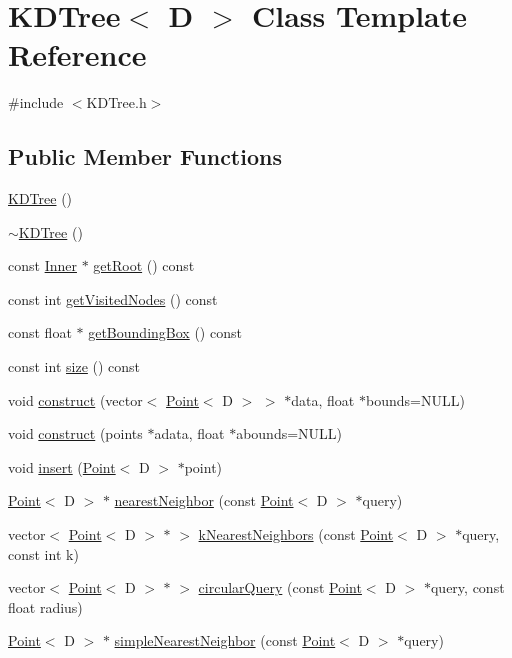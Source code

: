 \hypertarget{classKDTree}{\section{K\-D\-Tree$<$ D $>$ Class Template Reference}
\label{classKDTree}
}


{\ttfamily \#include $<$K\-D\-Tree.\-h$>$}

\subsection*{Public Member Functions}
\begin{DoxyCompactItemize}
\item 
\hyperlink{classKDTree_af8220208eafa9aaacd41164507870fba}{K\-D\-Tree} ()
\item 
\hyperlink{classKDTree_aa4bae329f2bdbb5ed8ce89070c43078c}{$\sim$\-K\-D\-Tree} ()
\item 
const \hyperlink{structInner}{Inner} $\ast$ \hyperlink{classKDTree_ad1ffc917a93f765773dbf3747ae9c7d0}{get\-Root} () const 
\item 
const int \hyperlink{classKDTree_a8e2b12172d5b99ddcbd4d20cbf81d321}{get\-Visited\-Nodes} () const 
\item 
const float $\ast$ \hyperlink{classKDTree_aab6b366c8f0ec6e2a1a9aa1854ee8439}{get\-Bounding\-Box} () const 
\item 
const int \hyperlink{classKDTree_accfe9020b6c62da899799e704e7b336a}{size} () const 
\item 
void \hyperlink{classKDTree_af3a771134ab1e1c1cf86f8c408c19371}{construct} (vector$<$ \hyperlink{structPoint}{Point}$<$ D $>$ $>$ $\ast$data, float $\ast$bounds=N\-U\-L\-L)
\item 
void \hyperlink{classKDTree_ac78f5936a47f871208bc2c85f33f1e83}{construct} (points $\ast$adata, float $\ast$abounds=N\-U\-L\-L)
\item 
void \hyperlink{classKDTree_a3f9325577ee126f3cdab502d0196bd1d}{insert} (\hyperlink{structPoint}{Point}$<$ D $>$ $\ast$point)
\item 
\hyperlink{structPoint}{Point}$<$ D $>$ $\ast$ \hyperlink{classKDTree_a5c1d096debead83854736ee964ed813a}{nearest\-Neighbor} (const \hyperlink{structPoint}{Point}$<$ D $>$ $\ast$query)
\item 
vector$<$ \hyperlink{structPoint}{Point}$<$ D $>$ $\ast$ $>$ \hyperlink{classKDTree_aee22752312318bdcdc2c9eb9507f103f}{k\-Nearest\-Neighbors} (const \hyperlink{structPoint}{Point}$<$ D $>$ $\ast$query, const int k)
\item 
vector$<$ \hyperlink{structPoint}{Point}$<$ D $>$ $\ast$ $>$ \hyperlink{classKDTree_ae64d4d34b6b974f425fe73e910335785}{circular\-Query} (const \hyperlink{structPoint}{Point}$<$ D $>$ $\ast$query, const float radius)
\item 
\hyperlink{structPoint}{Point}$<$ D $>$ $\ast$ \hyperlink{classKDTree_ad3c1911db577924d55b01d1ad4a53585}{simple\-Nearest\-Neighbor} (const \hyperlink{structPoint}{Point}$<$ D $>$ $\ast$query)
\end{DoxyCompactItemize}


